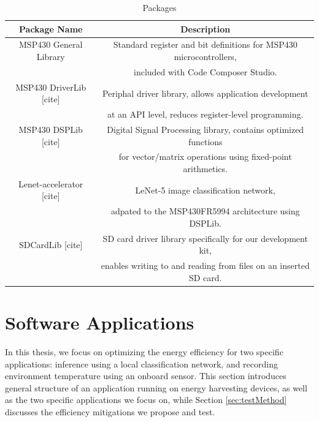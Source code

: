 \documentclass[twoside]{report}
\begin{document}
\begin{table}
    \begin{center}
        \begin{tabular}{ |c|c| }
            \hline
            \textbf{Package Name} & \textbf{Description} \\
            \hline
            MSP430 General Library & Standard register and bit definitions for MSP430 microcontrollers, \\
                                   & included with Code Composer Studio. \\
            \hline
            MSP430 DriverLib [cite] & Periphal driver library, allows application development \\
                                    & at an API level, reduces register-level programming.\\
            \hline
            MSP430 DSPLib [cite] & Digital Signal Processing library, contains optimized functions\\
                                 & for vector/matrix operations using fixed-point arithmetics.\\
            \hline
            Lenet-accelerator [cite] & LeNet-5 image classification network,\\
                                     & adpated to the MSP430FR5994 architecture using DSPLib.\\
            \hline
            SDCardLib [cite] & SD card driver library specifically for our development kit, \\
                             & enables writing to and reading from files on an inserted SD card. \\
            \hline
        \end{tabular} 
        \caption{Packages}
        \label{tab:packages}
    \end{center}
\end{table}

\section{Software Applications}
In this thesis, we focus on optimizing the energy efficiency for two specific applications: 
inference using a local classification network, and recording environment temperature using an 
onboard sensor. This section introduces general structure of an application running on energy harvesting devices, 
as well as the two specific applications we focus on, while Section \ref{sec:testMethod} 
discusses the efficiency mitigations we propose and test.
\end{document}
